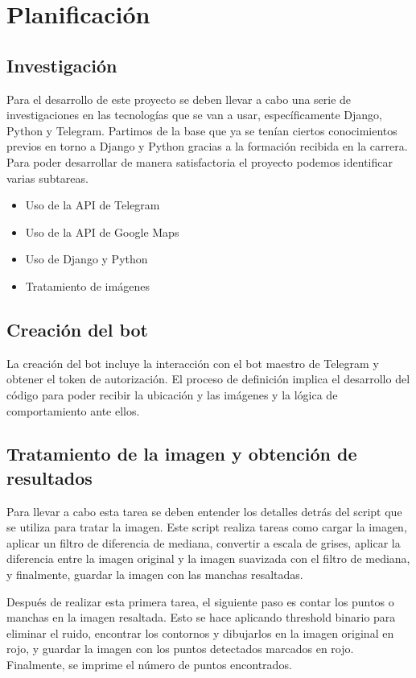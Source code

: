 \chapter{Planificación}\label{int}
\thispagestyle{fancy}


\section{Investigación}
Para el desarrollo de este proyecto se deben llevar a cabo una serie de investigaciones en las tecnologías que se van a usar, específicamente Django, Python y Telegram.
Partimos de la base que ya se tenían ciertos conocimientos previos en torno a Django y Python gracias a la formación recibida en la carrera.
Para poder desarrollar de manera satisfactoria el proyecto podemos identificar varias subtareas.
\begin{itemize}
    \item Uso de la API de Telegram
    \item Uso de la API de Google Maps
    \item Uso de Django y Python
    \item Tratamiento de imágenes
\end{itemize}
\section{Creación del bot}
La creación del bot incluye la interacción con el bot maestro de Telegram y obtener el token de autorización.
El proceso de definición implica el desarrollo del código para poder recibir la ubicación y las imágenes y la lógica de comportamiento ante ellos.
\section{Tratamiento de la imagen y obtención de resultados}
Para llevar a cabo esta tarea se deben entender los detalles detrás del script que se utiliza para tratar la imagen. Este script realiza tareas como cargar la imagen, aplicar un filtro de diferencia de mediana, convertir a escala de grises, aplicar la diferencia entre la imagen original y la imagen suavizada con el filtro de mediana, y finalmente, guardar la imagen con las manchas resaltadas.

Después de realizar esta primera tarea, el siguiente paso es contar los puntos o manchas en la imagen resaltada. Esto se hace aplicando threshold binario para eliminar el ruido, encontrar los contornos y dibujarlos en la imagen original en rojo, y guardar la imagen con los puntos detectados marcados en rojo. Finalmente, se imprime el número de puntos encontrados.



